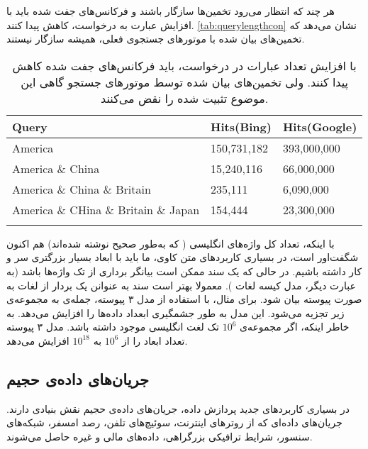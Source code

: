 هر چند که انتظار می‌رود تخمین‌ها سازگار باشند و فرکانس‌های جفت شده باید با افزایش عبارت به درخواست، کاهش پیدا کنند. 
\autoref{tab:querylengthcon}
نشان می‌دهد که تخمین‌های بیان شده با موتورهای جستجوی فعلی، همیشه سازگار نیستند.
\begin{table}[h]
\centering
\begin{latin}
\begin{tabular}{lll}
\hhline{===}
Query        				& Hits(Bing)    & Hits(Google) 	\\ \hline
America            			& 150,731,182 	& 393,000,000 	\\
America \& China          		& 15,240,116  	& 66,000,000 	\\
America \& China \& Britain     	& 235,111     	& 6,090,000     \\
America \& CHina \& Britain \& Japan 	& 154,444     	& 23,300,000    \\
\hhline{===}
\end{tabular}
\end{latin}
\caption{
با افزایش تعداد عبارات در درخواست، باید فرکانس‌های جفت شده کاهش پیدا کنند. ولی تخمین‌های بیان شده توسط موتورهای جستجو گاهی این موضوع تثبیت شده را نقض می‌کنند.
}
\label{tab:querylengthcon}
\end{table}

با اینکه، تعداد کل واژه‌های انگلیسی ( که به‌طور صحیح نوشته شده‌اند) هم اکنون شگفت‌اور است، در بسیاری کاربردهای متن کاوی، ما باید با ابعاد بسیار بزرگتری سر و کار داشته باشیم. در حالی که یک سند ممکن است بیانگر برداری از تک واژه‌ها باشد (به عبارت دیگر، مدل کیسه لغات
). معمولا بهتر است سند به عنوانن یک بردار از لغات به صورت 
پیوسته 
\cite{litez34}
بیان شود. برای مثال، با استفاده از مدل ۳ پیوسته، جمله‌ی
به مجموعه‌ی زیر تجزیه می‌شود. 
این مدل به طور جشمگیری ابعداد داده‌ها را افزایش می‌دهد. به خاطر اینکه، اگر مجموعه‌ی 
$10^6$
تک لغت انگلیسی موجود داشته باشد. مدل ۳ پیوسته تعداد ابعاد را از 
$10^6$
به 
$10^{18}$
افزایش می‌دهد.

\subsection{
جریان‌های داده‌ی حجیم
}
در بسیاری کاربردهای جدید پردازش داده، جریان‌های داده‌ی حجیم نقش بنیادی دارند. جریان‌های داده‌ای که از روترهای اینترنت، سوئیچ‌های تلفن، رصد امسفر، شبکه‌های سنسور، شرایط ترافیکی بزرگراهی، داده‌های مالی و غیره 
\cite{litez5, litez141, litez49, litez19, litez96, litez69, litez91}
حاصل می‌شوند.

